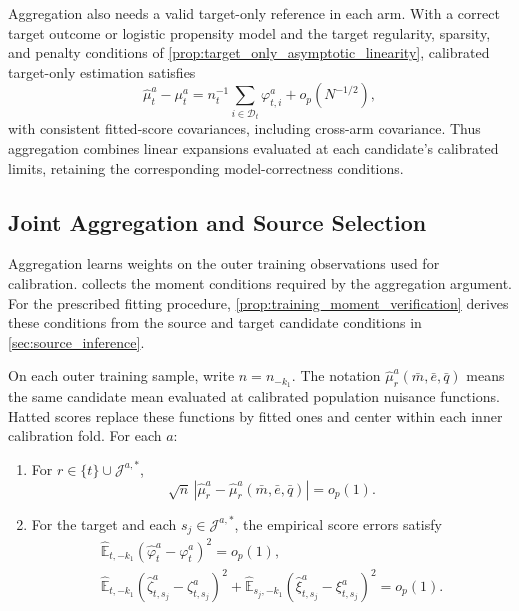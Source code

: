 \documentclass[12pt]{article}
\providecommand{\En}{\widehat{\mathbb E}}
\begin{document}
Aggregation also needs a valid target-only reference in each arm. With a correct target outcome or logistic propensity model and the target regularity, sparsity, and penalty conditions of \cref{prop:target_only_asymptotic_linearity}, calibrated target-only estimation satisfies
\[
\widehat\mu_t^a-\mu_t^a
=n_t^{-1}\sum_{i\in\mathcal D_t}\varphi_{t,i}^a+o_p(N^{-1/2}),
\]
with consistent fitted-score covariances, including cross-arm covariance. Thus aggregation combines linear expansions evaluated at each candidate's calibrated limits, retaining the corresponding model-correctness conditions.

\subsection{Joint Aggregation and Source Selection}\label{sec:joint_inference}

Aggregation learns weights on the outer training observations used for calibration.  collects the moment conditions required by the aggregation argument. For the prescribed fitting procedure, \cref{prop:training_moment_verification} derives these conditions from the source and target candidate conditions in \cref{sec:source_inference}.

\begin{assumption}\label{asmp:main_training_moments}
On each outer training sample, write $n=n_{-k_1}$. The notation $\widehat\mu_r^a(\bar m,\bar e,\bar q)$ means the same candidate mean evaluated at calibrated population nuisance functions. Hatted scores replace these functions by fitted ones and center within each inner calibration fold. For each $a$:
\begin{enumerate}[label=(\alph*),leftmargin=*]
\item For $r\in\{t\}\cup\mathcal J^{a,*}$,
\[
\sqrt n\,|\widehat\mu_r^a-\widehat\mu_r^a(\bar m,\bar e,\bar q)|=o_p(1).
\]
\item For the target and each $s_j\in\mathcal J^{a,*}$, the empirical score errors satisfy
\[
\begin{gathered}
\En_{t,-k_1}(\widehat\varphi_t^a-\varphi_t^a)^2=o_p(1),\\
\En_{t,-k_1}(\widehat\zeta_{t,s_j}^a-\zeta_{t,s_j}^a)^2
+\En_{s_j,-k_1}(\widehat\xi_{t,s_j}^a-\xi_{t,s_j}^a)^2=o_p(1).
\end{gathered}
\]
\end{enumerate}
\end{assumption}
\end{document}
